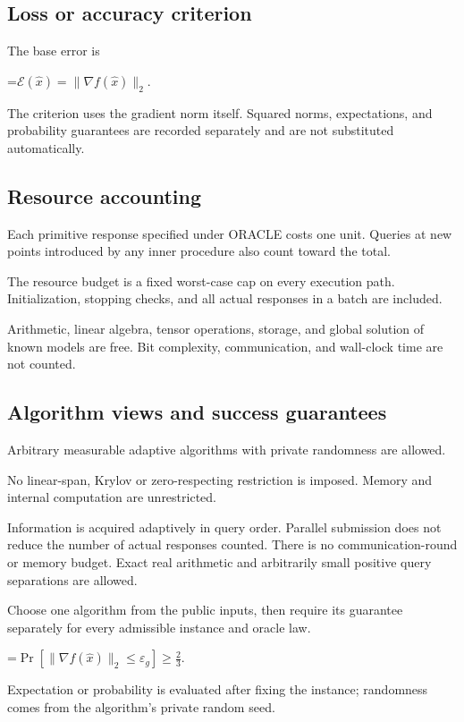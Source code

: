 \documentclass[10pt,a4paper]{article}
\newcommand{\AtlasMath}[1]{\par\begingroup\centering\setbox0=\hbox{$\displaystyle #1$}\ifdim\wd0>1.4\linewidth\typeout{ATLAS WIDE FORMULA: \the\wd0}\fi\ifdim\wd0>\linewidth\resizebox{\linewidth}{!}{\box0}\else\box0\fi\par\endgroup}
\begin{document}
\subsection{Loss or accuracy criterion}
The base error is


\AtlasMath{\mathcal{E}(\widehat{x})=\|\nabla f(\widehat{x})\|_2.}


The criterion uses the gradient norm itself. Squared norms, expectations, and probability guarantees are recorded separately and are not substituted automatically.

\subsection{Resource accounting}
Each primitive response specified under ORACLE costs one unit. Queries at new points introduced by any inner procedure also count toward the total.

The resource budget is a fixed worst-case cap on every execution path. Initialization, stopping checks, and all actual responses in a batch are included.

Arithmetic, linear algebra, tensor operations, storage, and global solution of known models are free. Bit complexity, communication, and wall-clock time are not counted.

\subsection{Algorithm views and success guarantees}
Arbitrary measurable adaptive algorithms with private randomness are allowed.

No linear-span, Krylov or zero-respecting restriction is imposed. Memory and internal computation are unrestricted.

Information is acquired adaptively in query order. Parallel submission does not reduce the number of actual responses counted. There is no communication-round or memory budget. Exact real arithmetic and arbitrarily small positive query separations are allowed.

Choose one algorithm from the public inputs, then require its guarantee separately for every admissible instance and oracle law.


\AtlasMath{\Pr\!\left[\|\nabla f(\widehat{x})\|_2\le \varepsilon_g\right]\ge\frac23.}


Expectation or probability is evaluated after fixing the instance; randomness comes from the algorithm's private random seed.
\end{document}

